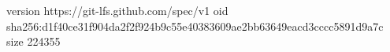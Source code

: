 version https://git-lfs.github.com/spec/v1
oid sha256:d1f40ce31f904da2f2f924b9c55e40383609ae2bb63649eacd3cccc5891d9a7c
size 224355
